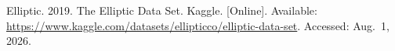 {\begin{enumerate}[label={[\arabic*]}]




\item Elliptic. 2019. The Elliptic Data Set. Kaggle. [Online]. Available: \url{https://www.kaggle.com/datasets/ellipticco/elliptic-data-set}. Accessed: Aug.~1, 2026.




\end{enumerate}}
